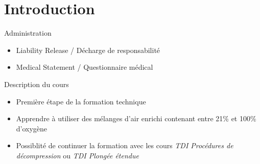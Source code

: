 
\section{Introduction}

\begin{frame}{Administration}
	\begin{itemize}
		\item Liability Release / Décharge de responsabilité
		\item Medical Statement / Questionnaire médical
	\end{itemize}
\end{frame}

\begin{frame}{Description du cours}
	\begin{itemize}
		\item Première étape de la formation technique
		\item Apprendre à utiliser des mélanges d'air enrichi contenant entre 21\% et 100\% d'oxygène
		\item Possiblité de continuer la formation avec les cours \textit{TDI Procédures de décompression} ou \textit{TDI Plongée étendue}
	\end{itemize}
\end{frame}
